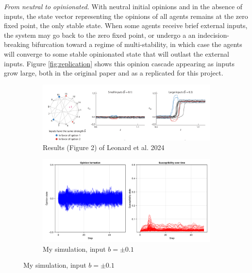 \documentclass[]{article}
\begin{document}
\textit{From neutral to opinionated.} With neutral initial opinions and in the absence of inputs, the state vector representing the opinions of all agents remains at the zero fixed point, the only stable state. When some agents receive brief external inputs, the system may go back to the zero fixed point, or undergo a an indecision-breaking bifurcation toward a regime of multi-stability, in which case the agents will converge to some stable opinionated state that will outlast the external inputs. Figure \ref{fig:replication} shows this opinion cascade appearing as inputs grow large, both in the original paper and as a replicated for this project.

\begin{figure}
	\centering
	\begin{subfigure}[t]{0.8\textwidth}
		\centering
		\includegraphics[width=\textwidth]{../plots/leonardfig2panA.png} 
		\caption{Results (Figure 2) of Leonard et al. 2024} \label{fig:damping1}
	\end{subfigure}
	
	\begin{subfigure}[t]{0.6\textwidth}
		\centering
		\includegraphics[width=\textwidth]{../plots/old/nog_constd_lowsig.png} 
		\caption{My simulation, input $b = \pm 0.1 $} \label{fig:damping2}
	\end{subfigure}
	

\end{figure}
\end{document}
